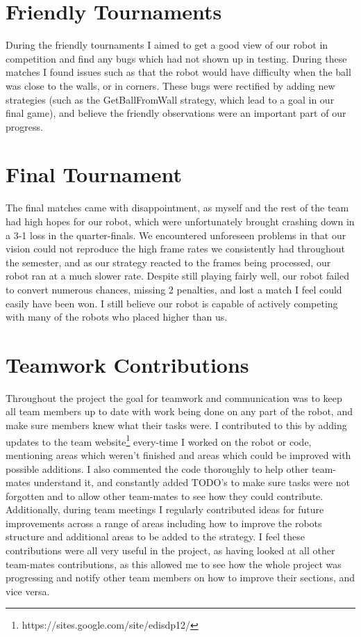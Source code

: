 \documentclass[12pt]{IEEEtran}
\begin{document}
\section{Friendly Tournaments}
During the friendly tournaments I aimed to get a good view of our robot in competition and find any bugs which had not shown up in testing. During these matches I found issues such as that the robot would have difficulty when the ball was close to the walls, or in corners. These bugs were rectified by adding new strategies (such as the GetBallFromWall strategy, which lead to a goal in our final game), and believe the friendly observations were an important part of our progress.


\section{Final Tournament}
The final matches came with disappointment, as myself and the rest of the team had high hopes for our robot, which were unfortunately brought crashing down in a 3-1 loss in the quarter-finals. We encountered unforeseen problems in that our vision could not reproduce the high frame rates we consistently had throughout the semester, and as our strategy reacted to the frames being processed, our robot ran at a much slower rate. Despite still playing fairly well, our robot failed to convert numerous chances, missing 2 penalties, and lost a match I feel could easily have been won. I still believe our robot is capable of actively competing with many of the robots who placed higher than us.

\section{Teamwork Contributions}
Throughout the project the goal for teamwork and communication was to keep all team members up to date with work being done on any part of the robot, and make sure members knew what their tasks were. I contributed to this by adding updates to the team website\footnote{https://sites.google.com/site/edisdp12/} every-time I worked on the robot or code, mentioning areas which weren't finished and areas which could be improved with possible additions. I also commented the code thoroughly to help other team-mates understand it, and constantly added TODO's to make sure tasks were not forgotten and to allow other team-mates to see how they could contribute. Additionally, during team meetings I regularly contributed ideas for future improvements across a range of areas including how to improve the robots structure and additional areas to be added to the strategy. I feel these contributions were all very useful in the project, as having looked at all other team-mates contributions, as this allowed me to see how the whole project was progressing and notify other team members on how to improve their sections, and vice versa.	
\end{document}
